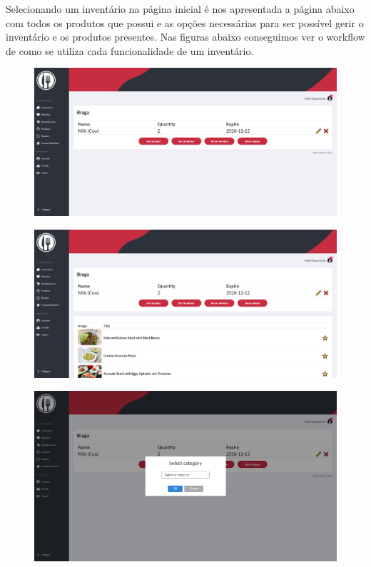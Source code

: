 \documentclass[a4paper]{report}
\begin{document}
    Selecionando um inventário na página inicial é nos apresentada a página
    abaixo com todos os produtos que possui e as opções necessárias para 
    ser possível gerir o inventário e os produtos presentes. Nas figuras
    abaixo conseguimos ver o workflow de como se utiliza cada funcionalidade
    de um inventário.

    \begin{figure}[H]
        \centering
            \includegraphics[width=\textwidth]{images/produto_final/iventario.png}
    \end{figure}

    \begin{figure}[H]
        \centering
            \includegraphics[width=\textwidth]{images/produto_final/iventario_receitas.png}
    \end{figure}

    \begin{figure}[H]
        \centering
            \includegraphics[width=\textwidth]{images/produto_final/inserir_produto_categoria.png}
    \end{figure}
\end{document}
